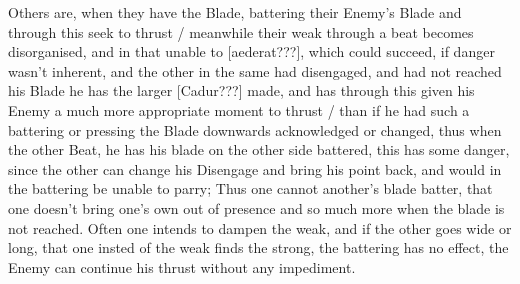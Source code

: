 Others are, when they have the Blade, battering their Enemy's Blade and
through this seek to thrust / meanwhile their weak through a beat
becomes disorganised, and in that unable to [aederat???], which could
succeed, if  danger wasn't inherent, and the other in the same had
disengaged, and had not reached his Blade he has the larger [Cadur???]
made, and has through this given his Enemy a much more appropriate
moment to thrust / than if he had such a battering or pressing the
Blade downwards acknowledged or changed, thus when the other Beat, he
has his blade on the other side battered, this has some danger, since
the other can change his Disengage and bring his point back, and would in
the battering be unable to parry; Thus one cannot another's blade
batter, that one doesn't bring one's own out of
presence and so much more when the blade is not
reached. Often one intends to dampen the weak, and if the other goes wide
or long, that one insted of the weak finds the strong, the battering
has no effect, the Enemy can continue his thrust without any impediment.

